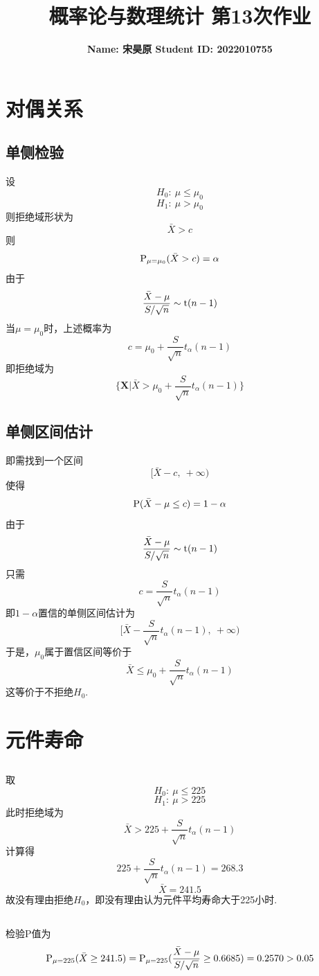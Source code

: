 \documentclass{article}
\title{\bf\Large  概率论与数理统计 第13次作业}
\author{\bf Name: 宋昊原 \qquad Student ID: 2022010755}
\begin{document}
\begin{CJK}{UTF8}{gbsn}
\maketitle
\section{对偶关系}
\subsection{单侧检验}
设
$$ H_{0}:\ \mu\leq\mu_{0} $$
$$ H_{1}:\ \mu>\mu_{0} $$
则拒绝域形状为
$$ \bar{X}>c $$
则
$$ {\rm P}_{\mu=\mu_{0}}(\bar{X}>c)=\alpha $$
由于
$$ \frac{\bar{X}-\mu}{S/\sqrt{n}}\sim{\rm t}(n-1)$$
当$\mu=\mu_{0}$时，上述概率为
$$ c = \mu_{0}+\frac{S}{\sqrt{n}}t_{\alpha}(n-1)$$
即拒绝域为
$$ \{\mathbf{X}\vert\bar{X}>\mu_{0}+\frac{S}{\sqrt{n}}t_{\alpha}(n-1)\}$$
\subsection{单侧区间估计}
即需找到一个区间
$$ [\bar{X}-c,\ +\infty) $$
使得
$$ {\rm P}(\bar{X}-\mu\leq c)=1-\alpha $$
由于
$$ \frac{\bar{X}-\mu}{S/\sqrt{n}}\sim{\rm t}(n-1) $$
只需
$$ c = \frac{S}{\sqrt{n}}t_{\alpha}(n-1)$$
即$1-\alpha$置信的单侧区间估计为
$$ [\bar{X}-\frac{S}{\sqrt{n}}t_{\alpha}(n-1),\ +\infty)$$
于是，$\mu_{0}$属于置信区间等价于
$$ \bar{X}\leq\mu_{0}+\frac{S}{\sqrt{n}}t_{\alpha}(n-1)$$
这等价于不拒绝$H_{0}$.
\section{元件寿命}
\subsection{}
取
$$ H_{0}:\ \mu\leq 225 $$
$$ H_{1}:\ \mu>225 $$
此时拒绝域为
$$ \bar{X}>225+\frac{S}{\sqrt{n}}t_{\alpha}(n-1)$$
计算得
$$ 225+\frac{S}{\sqrt{n}}t_{\alpha}(n-1)=268.3 $$
$$ \bar{X}=241.5 $$
故没有理由拒绝$H_{0}$，即没有理由认为元件平均寿命大于225小时.
\subsection{}
检验P值为
$$ {\rm P}_{\mu=225}(\bar{X}\geq 241.5)={\rm P}_{\mu=225}(\frac{\bar{X}-\mu}{S/\sqrt{n}}\geq 0.6685)=0.2570>0.05$$

\end{CJK}
\end{document}
